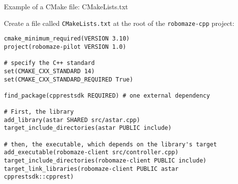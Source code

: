 \documentclass[compress]{beamer}
\begin{document}
\begin{frame}[fragile]{Example of a CMake file: CMakeLists.txt}

    Create a file called \texttt{CMakeLists.txt} at the root of the {\tt robomaze-cpp} project:

\begin{verbatim}
cmake_minimum_required(VERSION 3.10)
project(robomaze-pilot VERSION 1.0)

# specify the C++ standard
set(CMAKE_CXX_STANDARD 14)
set(CMAKE_CXX_STANDARD_REQUIRED True)

find_package(cpprestsdk REQUIRED) # one external dependency

# First, the library
add_library(astar SHARED src/astar.cpp)
target_include_directories(astar PUBLIC include)

# then, the executable, which depends on the library's target
add_executable(robomaze-client src/controller.cpp)
target_include_directories(robomaze-client PUBLIC include)
target_link_libraries(robomaze-client PUBLIC astar cpprestsdk::cpprest)
\end{verbatim}

\end{frame}
\end{document}
